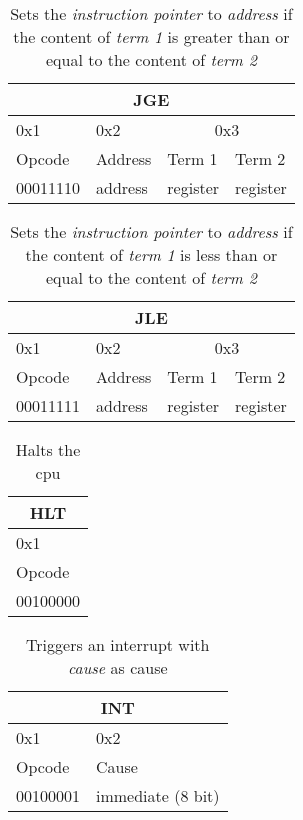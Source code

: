 \documentclass{article}
\begin{document}
\begin{table}[H]
  \centering
  \begin{tabular} { | p{2cm} | | p{2cm} | | p{2cm} | | p{2cm} |}
    \hline
    \multicolumn{4}{|c|}{JGE}\\
    \hline
    0x1 & 0x2 & \multicolumn{2}{|c|}{0x3}\\
    \hline
    Opcode & Address & Term 1 & Term 2\\
    00011110 & address & register & register \\
    \hline
  \end{tabular}
  \caption{Sets the \textit{instruction pointer} to \textit{address} if the content of \textit{term 1} is greater than or equal to the content of \textit{term 2}}
\end{table}

\begin{table}[H]
  \centering
  \begin{tabular} { | p{2cm} | | p{2cm} | | p{2cm} | | p{2cm} |}
    \hline
    \multicolumn{4}{|c|}{JLE}\\
    \hline
    0x1 & 0x2 & \multicolumn{2}{|c|}{0x3}\\
    \hline
    Opcode & Address & Term 1 & Term 2\\
    00011111 & address & register & register \\
    \hline
  \end{tabular}
  \caption{Sets the \textit{instruction pointer} to \textit{address} if the content of \textit{term 1} is less than or equal to the content of \textit{term 2}}
\end{table}

\begin{table}[H]
  \centering
  \begin{tabular} { | p{2cm} |}
    \hline
    \multicolumn{1}{|c|}{HLT}\\
    \hline
    0x1\\
    \hline
    Opcode\\
    00100000\\
    \hline
  \end{tabular}
  \caption{Halts the cpu}
\end{table}

\begin{table}[H]
  \centering
  \begin{tabular} { | p{2cm} | | p{3cm} | }
    \hline
    \multicolumn{2}{|c|}{INT}\\
    \hline
    0x1 & 0x2\\
    \hline
    Opcode & Cause\\
    00100001 & immediate (8 bit)\\
    \hline
  \end{tabular}
  \caption{Triggers an interrupt with \textit{cause} as cause}
\end{table}
\end{document}
